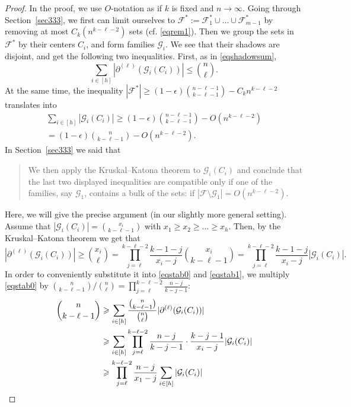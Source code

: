 \documentclass[graybox]{svmult}
\renewcommand{\le}{\leqslant}
\renewcommand{\ge}{\geqslant}
\newcommand{\ff}{\mathcal{F}}
\newcommand{\m}{\mathcal}
\begin{document}
\begin{proof} In the proof, we use $O$-notation as if $k$ is fixed and $n\to \infty$.
  Going through Section~\ref{sec333}, we first can limit ourselves to $\ff^*:=\ff_1^*\cup\ldots \cup \ff_{m-1}^*$ by removing at most $C_k(n^{k-\ell-2})$ sets (cf. \eqref{eqrem1}). Then we group the sets in $\ff^*$ by their centers $C_i$, and form families $\m G_i$. We see that their shadows are disjoint, and get the following two inequalities. First, as in \eqref{eqshadowsum}, 
  \begin{equation}\label{eqstab0}\sum_{i\in [h]}|\partial^{(\ell)}(\m G_i(C_i))|\le {n\choose \ell}.\end{equation}
  At the same time, the inequality $|\ff^*|\ge (1-\epsilon){n-\ell-1\choose k-\ell-1}-C_kn^{k-\ell-2}$ translates into
  \begin{multline}\label{eqstab1}\sum_{i\in [h]}|\m G_i(C_i)|\ge (1-\epsilon){n-\ell-1\choose k-\ell-1}-O(n^{k-\ell-2})\\= (1-\epsilon){n\choose k-\ell-1}-O(n^{k-\ell-2}).\end{multline}
In Section~\ref{sec333} we said that \begin{quote} We then apply the Kruskal--Katona theorem to $\m G_i(C_i)$ and conclude that the last two displayed inequalities are compatible only if one of the families, say $\m G_1$, contains a bulk of the sets: if $|\ff\setminus \m G_1|= O(n^{k-\ell-2})$.\end{quote}
Here, we will give the precise argument (in our slightly more general setting). Assume that $|\m G_i(C_i)| = {x_i\choose k-\ell-1}$ with $x_1\ge x_2\ge\ldots\ge x_h$. Then, by the Kruskal--Katona theorem we get that $$|\partial^{(\ell)}(\m G_i(C_i))|\ge {x_i\choose \ell}= \prod_{j=\ell}^{k-\ell-2}\frac{k-1-j}{x_i-j}{x_i\choose k-\ell-1}=\prod_{j=\ell}^{k-\ell-2}\frac{k-1-j}{x_i-j}|\m G_i(C_i)|.$$
In order to conveniently substitute it into \eqref{eqstab0} and \eqref{eqstab1}, we multiply \eqref{eqstab0} by ${n\choose k-\ell-1}/{n\choose \ell}=\prod_{j=\ell}^{k-\ell-2}\frac{n-j}{k-j-1}$:
\begin{align}
 \notag {n\choose k-\ell-1} &\ge \sum_{i\in [h]}\frac{{n\choose k-\ell-1}}{{n\choose \ell}}|\partial^{(\ell)}(\m G_i(C_i))| \\
 \notag &\ge  \sum_{i\in [h]}\prod_{j=\ell}^{k-\ell-2}\frac{n-j}{k-j-1}\cdot \frac{k-j-1}{x_i-j} |\m G_i(C_i)|\\
 \notag &\ge   \prod_{j=\ell}^{k-\ell-2}\frac{n-j}{x_1-j} \sum_{i\in [h]}|\m G_i(C_i)|\\

\end{align}
\end{proof}
\end{document}
